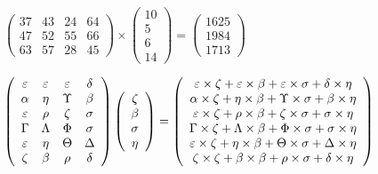 \documentclass[12pt]{article}
\begin{document}
 
 
\noindent{}
 
 

 
$\left( \begin{array}{ccccccccccccccc}
          37  & 
          43  & 
          24  & 
          64  \\ 
          47  & 
          52  & 
          55  & 
          66  \\ 
          63  & 
          57  & 
          28  & 
          45
\end{array}\right) \times
\left( \begin{array}{c}
          10  \\ 
           5  \\ 
           6  \\ 
          14
\end{array}\right)  =
\left( \begin{array}{c}
        1625  \\ 
        1984  \\ 
        1713
\end{array}\right)  $
 
$  %
 \left( \begin{array}
 {
 c
 c
 c
 c
 }
 \varepsilon & 
 \varepsilon & 
 \varepsilon & 
 \delta \\ 
 \alpha & 
 \eta & 
 \Upsilon & 
 \beta \\ 
 \varepsilon & 
 \rho & 
                    \zeta & 
 \sigma \\ 
 \Gamma & 
 \Lambda & 
 \Phi & 
 \sigma \\ 
 \varepsilon & 
 \eta & 
 \Theta & 
 \Delta \\ 
                    \zeta & 
 \beta & 
 \rho & 
 \delta
 \end{array} \right)
 \left( \begin{array}
 {
 c
 }
                    \zeta \\ 
 \beta \\ 
 \sigma \\ 
 \eta
 \end{array} \right)
=
 \left( \begin{array}
 {
 c
 }
  \varepsilon \times                     \zeta +  \varepsilon \times  \beta +  \varepsilon \times  \sigma +  \delta \times  \eta \\ 
  \alpha \times                     \zeta +  \eta \times  \beta +  \Upsilon \times  \sigma +  \beta \times  \eta \\ 
  \varepsilon \times                     \zeta +  \rho \times  \beta +                     \zeta \times  \sigma +  \sigma \times  \eta \\ 
  \Gamma \times                     \zeta +  \Lambda \times  \beta +  \Phi \times  \sigma +  \sigma \times  \eta \\ 
  \varepsilon \times                     \zeta +  \eta \times  \beta +  \Theta \times  \sigma +  \Delta \times  \eta \\ 
                     \zeta \times                     \zeta +  \beta \times  \beta +  \rho \times  \sigma +  \delta \times  \eta
 \end{array} \right)
$
 
\end{document}
